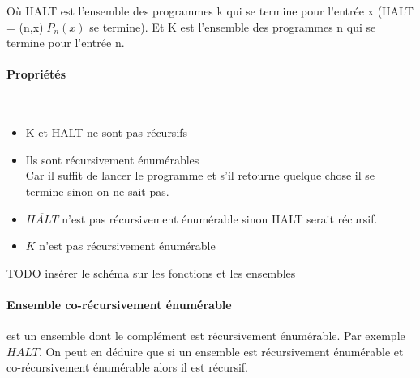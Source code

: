 \documentclass[11pt,a4paper]{article}
\renewcommand{\stcomp}[1]{\overline{#1}}
\begin{document}
Où HALT est l'ensemble des programmes k qui se termine pour l'entrée x (HALT = {(n,x)|$P_n(x)$ se 
termine}). Et K est l'ensemble des programmes n qui se termine pour l'entrée n.

\paragraph{Propriétés} \\

\begin{itemize}
	\item  K et HALT ne sont pas récursifs
	\item  Ils sont récursivement énumérables\\
		Car il suffit de lancer le programme et s’il retourne quelque 
		chose il se termine sinon on ne sait pas.
	\item  $\stcomp{HALT}$ n'est pas récursivement énumérable sinon HALT 
		serait récursif.
	\item $\stcomp{K}$ n'est pas récursivement énumérable
\end{itemize}

TODO insérer le schéma sur les fonctions et les ensembles

\paragraph{Ensemble co-récursivement énumérable} est un ensemble dont le 
complément est récursivement énumérable. Par exemple $\stcomp{HALT}$. On peut 
en déduire que si un ensemble est récursivement énumérable et co-récursivement 
énumérable alors il est récursif.





\end{document}
